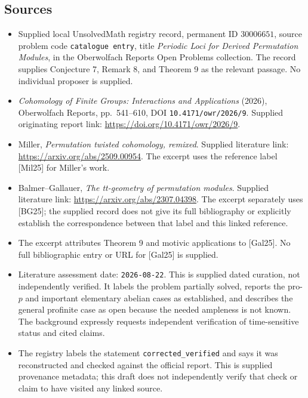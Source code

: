 \documentclass[11pt]{article}
\begin{document}
\subsection{Sources}
\begin{itemize}
\item Supplied local UnsolvedMath registry record, permanent ID \(30006651\), source problem code \texttt{catalogue entry}, title \emph{Periodic Loci for Derived Permutation Modules}, in the Oberwolfach Reports Open Problems collection. The record supplies Conjecture 7, Remark 8, and Theorem 9 as the relevant passage. No individual proposer is supplied.
\item \emph{Cohomology of Finite Groups: Interactions and Applications} (2026), Oberwolfach Reports, pp.\ 541--610, DOI \texttt{10.4171/owr/2026/9}. Supplied originating report link: \url{https://doi.org/10.4171/owr/2026/9}.
\item Miller, \emph{Permutation twisted cohomology, remixed}. Supplied literature link: \url{https://arxiv.org/abs/2509.00954}. The excerpt uses the reference label [Mil25] for Miller's work.
\item Balmer--Gallauer, \emph{The tt-geometry of permutation modules}. Supplied literature link: \url{https://arxiv.org/abs/2307.04398}. The excerpt separately uses [BG25]; the supplied record does not give its full bibliography or explicitly establish the correspondence between that label and this linked reference.
\item The excerpt attributes Theorem 9 and motivic applications to [Gal25]. No full bibliographic entry or URL for [Gal25] is supplied.
\item Literature assessment date: \texttt{2026-08-22}. This is supplied dated curation, not independently verified. It labels the problem partially solved, reports the pro-\(p\) and important elementary abelian cases as established, and describes the general profinite case as open because the needed ampleness is not known. The background expressly requests independent verification of time-sensitive status and cited claims.
\item The registry labels the statement \texttt{corrected\_verified} and says it was reconstructed and checked against the official report. This is supplied provenance metadata; this draft does not independently verify that check or claim to have visited any linked source.
\end{itemize}
\end{document}
